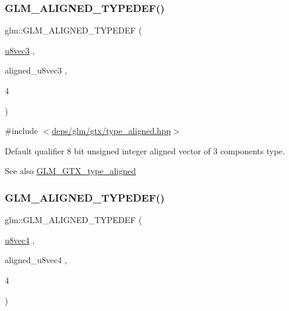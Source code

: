 \subsubsection{\texorpdfstring{G\+L\+M\+\_\+\+A\+L\+I\+G\+N\+E\+D\+\_\+\+T\+Y\+P\+E\+D\+E\+F()}{GLM\_ALIGNED\_TYPEDEF()}\hspace{0.1cm}{\footnotesize\ttfamily [123/209]}}
{\footnotesize\ttfamily glm\+::\+G\+L\+M\+\_\+\+A\+L\+I\+G\+N\+E\+D\+\_\+\+T\+Y\+P\+E\+D\+EF (\begin{DoxyParamCaption}\item[{\hyperlink{group__gtc__type__precision_gaa86b325e581afdc643495fbe428c1f1b}{u8vec3}}]{,  }\item[{aligned\+\_\+u8vec3}]{,  }\item[{4}]{ }\end{DoxyParamCaption})}



{\ttfamily \#include $<$\hyperlink{gtx_2type__aligned_8hpp}{deps/glm/gtx/type\+\_\+aligned.\+hpp}$>$}

Default qualifier 8 bit unsigned integer aligned vector of 3 components type. \begin{DoxySeeAlso}{See also}
\hyperlink{group__gtx__type__aligned}{G\+L\+M\+\_\+\+G\+T\+X\+\_\+type\+\_\+aligned} 
\end{DoxySeeAlso}
\mbox{\label{group__gtx__type__aligned_ga8b8588bb221448f5541a858903822a57}} 
\subsubsection{\texorpdfstring{G\+L\+M\+\_\+\+A\+L\+I\+G\+N\+E\+D\+\_\+\+T\+Y\+P\+E\+D\+E\+F()}{GLM\_ALIGNED\_TYPEDEF()}\hspace{0.1cm}{\footnotesize\ttfamily [124/209]}}
{\footnotesize\ttfamily glm\+::\+G\+L\+M\+\_\+\+A\+L\+I\+G\+N\+E\+D\+\_\+\+T\+Y\+P\+E\+D\+EF (\begin{DoxyParamCaption}\item[{\hyperlink{group__gtc__type__precision_ga6c8841fa492bd5b1078b171452fd6974}{u8vec4}}]{,  }\item[{aligned\+\_\+u8vec4}]{,  }\item[{4}]{ }\end{DoxyParamCaption})}



